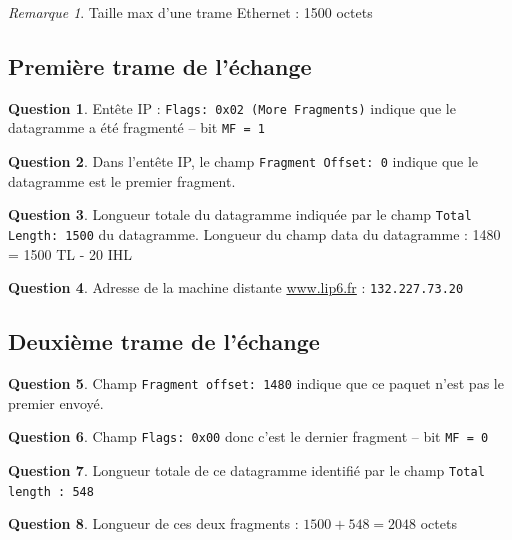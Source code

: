 \documentclass[11pt,english,french]{scrreprt}
\theoremstyle{remark}
\newtheorem*{rem*}{Remarque}
\theoremstyle{definition}
\newtheorem{ques*}{Question}[subsection]
\begin{document}
\begin{rem*}
	Taille max d'une trame Ethernet : 1500 octets
\end{rem*}

\setcounter{subsection}{5}

\subsection{Première trame de l'échange} %

\begin{ques*}
	Entête IP : \lstinline!Flags: 0x02 (More Fragments)! indique que le datagramme a été fragmenté -- bit \lstinline!MF = 1!
\end{ques*}

\begin{ques*}
	Dans l'entête IP, le champ \lstinline!Fragment Offset: 0! indique que le datagramme est le premier fragment.
\end{ques*}

\begin{ques*}
	Longueur totale du datagramme indiquée par le champ \lstinline!Total Length: 1500! du datagramme.
	Longueur du champ data du datagramme : 1480 = 1500 TL - 20 IHL
\end{ques*}

\begin{ques*}
	Adresse de la machine distante \url{www.lip6.fr} : \lstinline!132.227.73.20!
\end{ques*}

\subsection{Deuxième trame de l'échange} %

\begin{ques*}
	Champ \lstinline!Fragment offset: 1480! indique que ce paquet n'est pas le premier envoyé.
\end{ques*}

\begin{ques*}
	Champ \lstinline!Flags: 0x00! donc c'est le dernier fragment -- bit \lstinline!MF = 0!
\end{ques*}

\begin{ques*}
	Longueur totale de ce datagramme identifié par le champ \lstinline!Total length : 548!
\end{ques*}

\begin{ques*}
	 Longueur de ces deux fragments : $1500 + 548 = 2048$ octets
\end{ques*}
\end{document}
